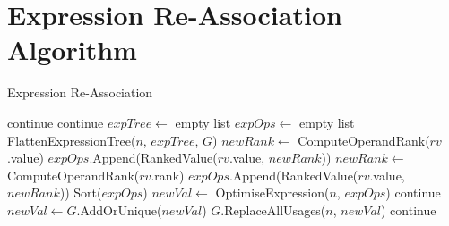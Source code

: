 \documentclass[12pt,openany,a4paper]{book}
\begin{document}
\section{Expression Re-Association Algorithm}
\begin{algorithm}[H]
    \caption{Expression Re-Association} \label{reassociateexpr}
    \begin{algorithmic}[1]
                    \State continue
                \EndIf
                    \State continue
                \EndIf
                \State $expTree \gets$ empty list
                \State $expOps \gets$ empty list
                \State FlattenExpressionTree($n$, $expTree$, $G$)
                        \State $newRank \gets$ ComputeOperandRank($rv$.value)
                        \State $expOps$.Append(RankedValue($rv$.value, $newRank$))
                            \State $newRank \gets$ ComputeOperandRank($rv$.rank)
                            \State $expOps$.Append(RankedValue($rv$.value, $newRank$))
                        \EndFor
                    \EndIf
                \EndFor
                \State Sort($expOps$)
                \State $newVal \gets$ OptimiseExpression($n$, $expOps$)
                        \State continue
                    \EndIf
                    \State $newVal \gets G$.AddOrUnique($newVal$)
                    \State $G$.ReplaceAllUsages($n$, $newVal$)
                    \State continue
                \EndIf
    \end{algorithmic}
\end{algorithm}
\end{document}
